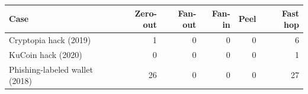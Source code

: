 \begin{tabular}{l r r r r r}\toprule
\textbf{Case} & \textbf{Zero-out} & \textbf{Fan-out} & \textbf{Fan-in} & \textbf{Peel} & \textbf{Fast hop}\\\midrule
Cryptopia hack (2019) & 1 & 0 & 0 & 0 & 6\\
KuCoin hack (2020) & 0 & 0 & 0 & 0 & 1\\
Phishing-labeled wallet (2018) & 26 & 0 & 0 & 0 & 27\\
\bottomrule\end{tabular}
